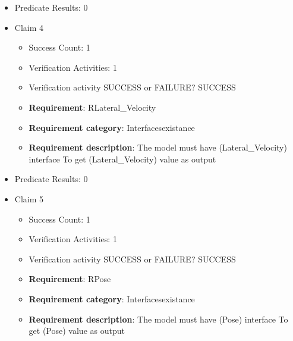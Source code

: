 \documentclass{article}
\begin{document}
\begin{itemize}
\begin{itemize}
						\item \textbf{Requirement}: RLongitudinal\_Velocity 
						\item \textbf{Requirement category}: Interfacesexistance 
						\item \textbf{Requirement description}: The model must have (Longitudinal\_Velocity) interface To get (Longitudinal\_Velocity) value as output
					
				\end{itemize}
				
									    
				\item Predicate Results: 0

  				  \item Claim 4
				\begin{itemize}
			    	\item Success Count: 1 
			    	\item Verification Activities: 1
					\item Verification activity SUCCESS or FAILURE? SUCCESS
		
						\item \textbf{Requirement}: RLateral\_Velocity 
						\item \textbf{Requirement category}: Interfacesexistance 
						\item \textbf{Requirement description}: The model must have (Lateral\_Velocity) interface To get (Lateral\_Velocity) value as output
					
				\end{itemize}
				
									    
				\item Predicate Results: 0

  				  \item Claim 5
				\begin{itemize}
			    	\item Success Count: 1 
			    	\item Verification Activities: 1
					\item Verification activity SUCCESS or FAILURE? SUCCESS
		
						\item \textbf{Requirement}: RPose 
						\item \textbf{Requirement category}: Interfacesexistance 
						\item \textbf{Requirement description}: The model must have (Pose) interface To get (Pose) value as output
					
				\end{itemize}
				

\end{itemize}
\end{document}
